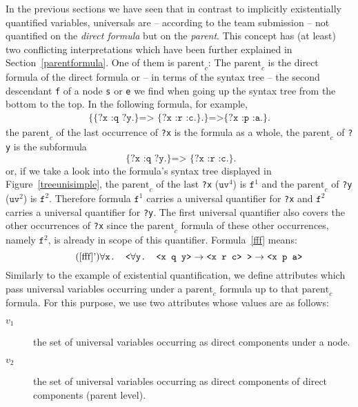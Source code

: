 In the previous sections we have seen that in contrast to implicitly existentially quantified variables, 
universals are -- according to the \wwwc team submission -- not quantified on the \emph{direct formula}
but on the \emph{parent}.
This concept has (at least) two conflicting interpretations which have been further explained in 
Section~\ref{parentformula}. One of them is $\text{parent}_c$:  %
The $\text{parent}_c$ is the direct formula of the direct formula or -- in terms of the syntax tree -- the second descendant \texttt{f} of a node \texttt{s} or 
\texttt{e} we find when going up the syntax tree from the bottom to the top.
In the following formula, for example,
\begin{multline}\label{fff}
\texttt{\{\{?x :q ?y.\} => \{?x :r :c.\}.\} =>}
\texttt{\{?x :p :a.\}.}
\end{multline}
the $\text{parent}_c$ of the last occurrence of \texttt{?x} is the formula as a whole,
the $\text{parent}_c$ of \texttt{?y} is the subformula
\[
 \texttt{ \{?x :q ?y.\} => \{?x :r :c.\}.}
\]
or, if we take a look into the formula's syntax tree displayed in Figure~\ref{treeunisimple}, 
the $\text{parent}_c$ of the last \texttt{?x} ($\texttt{uv}^4$) is $\texttt{f}^1$ and 
the $\text{parent}_c$ of \texttt{?y} ($\texttt{uv}^2$) is
$\texttt{f}^2$. Therefore formula $\texttt{f}^1$ carries a universal quantifier for \texttt{?x} and $\texttt{f}^2$ carries a universal quantifier for \texttt{?y}.
The first universal quantifier also covers the other occurrences of \texttt{?x} since the $\text{parent}_c$ formula of these
other occurrences, namely $\texttt{f}^2$, is already 
in scope of this quantifier. %
Formula~\ref{fff} means:
\begin{equation}\tag{\ref{fff}'}\label{iall}
 \forall \texttt{x. } \texttt{<} \forall \texttt{y. <x q y>} \rightarrow \texttt{<x r c> >} \rightarrow \texttt{<x p a>}
\end{equation}
Similarly to the example of existential quantification, 
we define attributes which pass universal variables occurring under a $\text{parent}_c$ formula up to that $\text{parent}_c$ formula. 
For this purpose, we use two attributes whose values are as follows:
\begin{description}
 \item[$v_1$]  the set of universal variables occurring as direct components under a node.
 \item[$v_2$]  the set of universal variables occurring as direct components of direct components (parent level).
\end{description}
